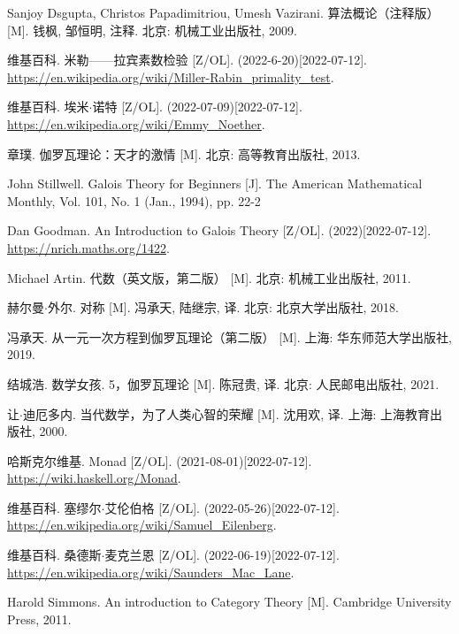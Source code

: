 \documentclass[UTF8]{article}
\begin{document}
\begin{thebibliography}{99}
Sanjoy Dsgupta, Christos Papadimitriou, Umesh Vazirani. 算法概论（注释版） [M]. 钱枫, 邹恒明, 注释. 北京: 机械工业出版社, 2009. %

维基百科. 米勒——拉宾素数检验 [Z/OL]. (2022-6-20)[2022-07-12]. \url{https://en.wikipedia.org/wiki/Miller-Rabin_primality_test}.

维基百科. 埃米$\cdot$诺特 [Z/OL]. (2022-07-09)[2022-07-12]. \url{https://en.wikipedia.org/wiki/Emmy_Noether}.

章璞. 伽罗瓦理论：天才的激情 [M]. 北京: 高等教育出版社, 2013. %

John Stillwell. Galois Theory for Beginners  [J]. The American Mathematical Monthly, Vol. 101, No. 1 (Jan., 1994), pp. 22-2

Dan Goodman. An Introduction to Galois Theory [Z/OL]. (2022)[2022-07-12]. \url{https://nrich.maths.org/1422}.

Michael Artin. 代数（英文版，第二版） [M]. 北京: 机械工业出版社, 2011. %

赫尔曼$\cdot$外尔. 对称 [M]. 冯承天, 陆继宗, 译. 北京: 北京大学出版社, 2018. %

冯承天. 从一元一次方程到伽罗瓦理论（第二版） [M]. 上海: 华东师范大学出版社, 2019. %

结城浩. 数学女孩. 5，伽罗瓦理论 [M]. 陈冠贵, 译. 北京: 人民邮电出版社, 2021. %


让$\cdot$迪厄多内. 当代数学，为了人类心智的荣耀 [M]. 沈用欢, 译. 上海: 上海教育出版社, 2000. %

哈斯克尔维基. Monad [Z/OL]. (2021-08-01)[2022-07-12]. \url{https://wiki.haskell.org/Monad}.

维基百科. 塞缪尔$\cdot$艾伦伯格 [Z/OL]. (2022-05-26)[2022-07-12]. \url{https://en.wikipedia.org/wiki/Samuel_Eilenberg}.

维基百科. 桑德斯$\cdot$麦克兰恩 [Z/OL]. (2022-06-19)[2022-07-12]. \url{https://en.wikipedia.org/wiki/Saunders_Mac_Lane}.

Harold Simmons. An introduction to Category Theory [M]. Cambridge University Press, 2011. %


\end{thebibliography}
\end{document}
